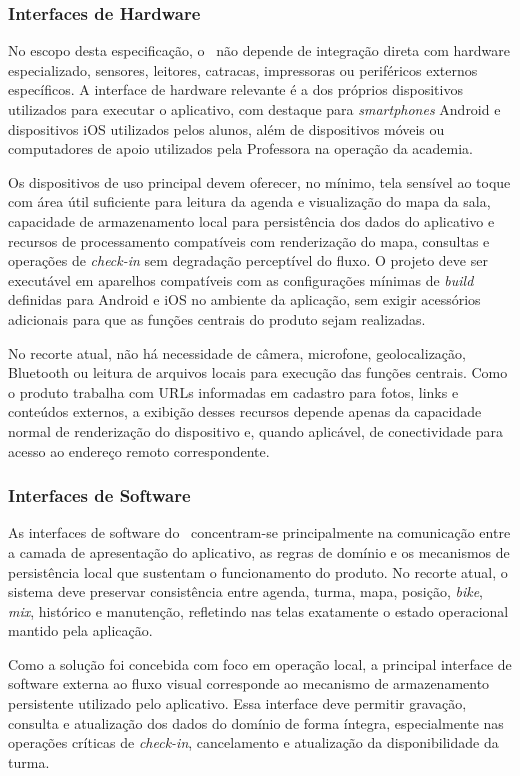 \subsubsection{Interfaces de Hardware}
No escopo desta especificação, o \ProjetoNome\ não depende de integração direta com hardware especializado, sensores, leitores, catracas, impressoras ou periféricos externos específicos. A interface de hardware relevante é a dos próprios dispositivos utilizados para executar o aplicativo, com destaque para \textit{smartphones} Android e dispositivos iOS utilizados pelos alunos, além de dispositivos móveis ou computadores de apoio utilizados pela Professora na operação da academia.

Os dispositivos de uso principal devem oferecer, no mínimo, tela sensível ao toque com área útil suficiente para leitura da agenda e visualização do mapa da sala, capacidade de armazenamento local para persistência dos dados do aplicativo e recursos de processamento compatíveis com renderização do mapa, consultas e operações de \textit{check-in} sem degradação perceptível do fluxo. O projeto deve ser executável em aparelhos compatíveis com as configurações mínimas de \textit{build} definidas para Android e iOS no ambiente da aplicação, sem exigir acessórios adicionais para que as funções centrais do produto sejam realizadas.

No recorte atual, não há necessidade de câmera, microfone, geolocalização, Bluetooth ou leitura de arquivos locais para execução das funções centrais. Como o produto trabalha com URLs informadas em cadastro para fotos, links e conteúdos externos, a exibição desses recursos depende apenas da capacidade normal de renderização do dispositivo e, quando aplicável, de conectividade para acesso ao endereço remoto correspondente.

\subsubsection{Interfaces de Software}
As interfaces de software do \ProjetoNome\ concentram-se principalmente na comunicação entre a camada de apresentação do aplicativo, as regras de domínio e os mecanismos de persistência local que sustentam o funcionamento do produto. No recorte atual, o sistema deve preservar consistência entre agenda, turma, mapa, posição, \textit{bike}, \textit{mix}, histórico e manutenção, refletindo nas telas exatamente o estado operacional mantido pela aplicação.

Como a solução foi concebida com foco em operação local, a principal interface de software externa ao fluxo visual corresponde ao mecanismo de armazenamento persistente utilizado pelo aplicativo. Essa interface deve permitir gravação, consulta e atualização dos dados do domínio de forma íntegra, especialmente nas operações críticas de \textit{check-in}, cancelamento e atualização da disponibilidade da turma.

